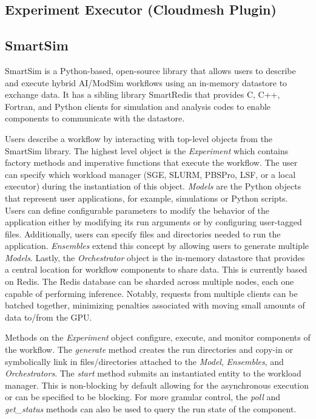 \documentclass[utf8]{FrontiersinVancouver} %
\begin{document}
\citep{las-frontiers-edu}

\subsection{Experiment Executor (Cloudmesh Plugin)}

\subsection{SmartSim}

SmartSim is a Python-based, open-source library that allows users to describe and execute hybrid AI/ModSim workflows using an in-memory datastore to exchange data. It has a sibling library SmartRedis that provides C, C++, Fortran, and  Python clients for simulation and analysis codes to enable components to communicate with the datastore.

Users describe a workflow by interacting with top-level objects from the
SmartSim library. The highest level object is the {\em Experiment} which contains factory methods and imperative functions that execute the workflow. The user can
specify which workload manager (SGE, SLURM, PBSPro, LSF, or a local executor) during the instantiation of this object. {\em Models} are the Python objects that represent user applications, for example, simulations or Python scripts. Users can define configurable parameters to modify the behavior of the application either by modifying its run arguments or by configuring user-tagged files. Additionally, users can specify files and directories needed to run the application. {\em Ensembles} extend this concept by allowing users to generate multiple {\em Models}. Lastly, the {\em Orchestrator} object is the in-memory datastore that provides a central location for workflow components to share data. This is currently based on Redis. The Redis database can be sharded across multiple nodes, each one capable of performing inference. Notably, requests from multiple clients can be batched together, minimizing penalties associated with
moving small amounts of data to/from the GPU.

Methods on the {\em Experiment} object configure, execute, and monitor components of the workflow. The {\em generate} method creates the run directories and copy-in or symbolically link in files/directories attached to the {\em Model},  {\em Ensembles}, and {\em Orchestrators}. The {\em start} method submits an instantiated entity to the workload manager. This is non-blocking by default allowing for the asynchronous execution or can be specified to be blocking. For more granular control, the {\em poll} and {\em get\_status} methods can also be used to query the run state of the component.
\end{document}
